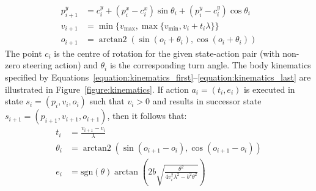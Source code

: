 \documentclass[10pt]{article}
\theoremstyle{plain}
\DeclareMathOperator*{\arctantwo}{arctan2}
\begin{document}
\begin{align}
    p_{i+1}^{y} & = c_{i}^{y} + (p_{i}^{x} - c_{i}^{x}) \sin{\theta_{i}} + (p_{i}^{y} - c_{i}^{y}) \cos{\theta_{i}} \\
    v_{i+1} & = \min\{ v_{\max}, \max\{ v_{\min}, v_{i} + t_{i} \lambda \} \} \\
    o_{i+1} & = \arctantwo{(\sin{(o_{i} + \theta_{i})}, \cos{(o_{i} + \theta_{i})})} \label{equation:kinematics_last}
\end{align}
The point $c_{i}$ is the centre of rotation for the given state-action pair (with non-zero steering action) and $\theta_{i}$ is the corresponding turn angle.
The body kinematics specified by Equations~\ref{equation:kinematics_first}--\ref{equation:kinematics_last} are illustrated in Figure~\ref{figure:kinematics}.
If action $a_{i} = (t_{i}, e_{i})$ is executed in state $s_{i} = (p_{i}, v_{i}, o_{i})$ such that $v_{i} > 0$ and results in successor state $s_{i+1} = (p_{i+1}, v_{i+1}, o_{i+1})$, then it follows that:
\begin{align}
    t_{i} & = \frac{v_{i+1} - v_{i}}{\lambda} \\
    \theta_{i} & = \arctantwo{(\sin{(o_{i+1} - o_{i})}, \cos{(o_{i+1} - o_{i})})} \\
    e_{i} & = \text{sgn}(\theta) \arctan{\left( 2 b \sqrt{\frac{\theta^{2}}{4 v_{i}^{2} \lambda^{2} - b^{2} \theta^{2}}} \right)} \label{equation:error}
\end{align}
\end{document}
